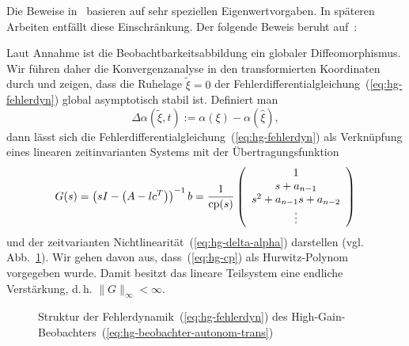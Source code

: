 Die Beweise in~\cite{gauthier92,ciccarella93,dalla-mora1997} basieren
auf sehr speziellen Eigenwertvorgaben. In späteren Arbeiten entfällt
diese Einschränkung. Der folgende Beweis beruht auf~\cite{roebenack2012ssd,roebenack2016sac}:\nocite{derbel2016sac}
\begin{svmultproof2}
Laut Annahme ist die Beobachtbarkeitsabbildung ein globaler Diffeomorphismus.
Wir führen daher die Konvergenzanalyse in den transformierten Koordinaten
durch und zeigen, dass die Ruhelage $\tilde{\xi}=0$ der Fehlerdifferentialgleichung~(\ref{eq:hg-fehlerdyn})
global asymptotisch stabil ist. Definiert man 
\begin{equation}
\Delta\alpha(\tilde{\xi},t):=\alpha(\xi)-\alpha(\hat{\xi}),\label{eq:hg-delta-alpha}
\end{equation}
dann lässt sich die Fehlerdifferentialgleichung~(\ref{eq:hg-fehlerdyn})
als Verknüpfung eines linearen zeitinvarianten Systems mit der Übertragungsfunktion
\[
G(s)=\left(sI-\left(A-lc^{T}\right)\right)^{-1}b=\frac{1}{{\operatorname{cp}}(s)}\left(\begin{array}{c}
1\\
s+a_{n-1}\\
s^{2}+a_{n-1}s+a_{n-2}\\
\vdots
\end{array}\right)
\]
und der zeitvarianten Nichtlinearität~(\ref{eq:hg-delta-alpha})
darstellen (vgl. Abb.~\ref{fig:Fehlerdynamik-High-Gain}). Wir gehen
davon aus, dass~(\ref{eq:hg-cp}) als Hurwitz-Polynom vorgegeben
wurde. Damit besitzt das lineare Teilsystem eine endliche Verstärkung,
d.\,h. $\|G\|_{\infty}<\infty$.
\begin{figure}
\begin{centering}
\resizebox{0.82\textwidth}{!}{}
\par\end{centering}
\caption{Struktur der Fehlerdynamik~(\ref{eq:hg-fehlerdyn}) des High-Gain-Beobachters~(\ref{eq:hg-beobachter-autonom-trans})\label{fig:Fehlerdynamik-High-Gain}}
\end{figure}


\end{svmultproof2}
